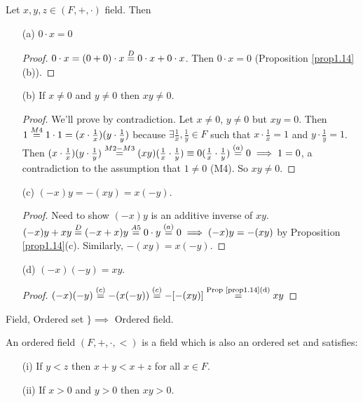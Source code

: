 \documentclass[]{article}
\begin{document}
\begin{proposition}
	\label{prop1.16}
	Let $x,y,z\in (F,+,\cdot)$ field. Then
	\begin{enumerate}
		\item[(a)] $0\cdot x = 0$
		\begin{proof}
			$0\cdot x = (0+0)\cdot x \overset{D}{=} 0\cdot x + 0\cdot x$. Then $0\cdot x = 0$ (Proposition \ref{prop1.14}(b)).
		\end{proof}
		\item[(b)] If $x\neq 0$ and $y\neq 0$ then $xy\neq 0$.
		\begin{proof}
			We'll prove by contradiction. Let $x\neq 0$, $y\neq 0$ but $xy=0$. Then $1 \overset{M4}{=} 1\cdot 1 = (x\cdot \frac{1}{x})(y\cdot \frac{1}{y})$ because $\exists \frac{1}{x},\frac{1}{y}\in F$ such that $x\cdot \frac{1}{x} = 1$ and $y\cdot \frac{1}{y} = 1$. Then $(x\cdot \frac{1}{x})(y\cdot \frac{1}{y}) \overset{M2-M3}{=} (xy)(\frac{1}{x}\cdot\frac{1}{y}) \equiv 0(\frac{1}{x}\cdot\frac{1}{y}) \overset{(a)}{=} 0 \implies 1 =0$, a contradiction to the assumption that $1\neq 0$ (M4). So $xy\neq 0$.
		\end{proof}
		\item[(c)] $(-x)y = -(xy) = x(-y)$.
		\begin{proof}
			Need to show $(-x)y$ is an additive inverse of $xy$. $(-x)y + xy \overset{D}{=} (-x+x)y \overset{A5}{=} 0\cdot y \overset{(a)}{=} 0 \implies (-x)y = -(xy)$ by Proposition \ref{prop1.14}(c). Similarly, $-(xy) = x(-y)$.
		\end{proof}
		\item[(d)] $(-x)(-y) = xy$.
		\begin{proof}
			$(-x)(-y) \overset{(c)}{=} -(x(-y)) \overset{(c)}{=} -[-(xy)] \overset{\text{Prop \ref{prop1.14}(d)}}{=} xy$
		\end{proof}
	\end{enumerate}
\end{proposition}

Field, Ordered set $\}\implies$ Ordered field.

\begin{definition}
	An ordered field $(F,+,\cdot,<)$ is a field which is also an ordered set and satisfies:
	\begin{enumerate}
		\item[(i)] If $y<z$ then $x+y<x+z$ for all $x\in F$.
		\item[(ii)] If $x>0$ and $y>0$ then $xy>0$.
	\end{enumerate}
\end{definition}
\end{document}
